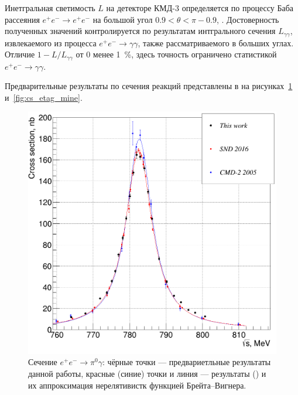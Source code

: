 Инетгральная светимость $L$ на детекторе КМД-3 определяется по процессу Баба рассеяния
$e^+e^- \to e^+e^-$ на большой угол $0.9 < \theta < \pi - 0.9$,
\cite{Ryzhenenkov:2017xqu}.
Достоверность полученных значений контролируется по результатам интгрального сечения $L_{\gamma \gamma}$,
извлекаемого из процесса $e^+e^- \to \gamma \gamma$,
также рассматриваемого в больших углах.
Отличие $1 - L / L_{\gamma \gamma}$ от 0 менее \SI{1}{\percent},
здесь точность ограничено статистикой $e^+e^- \to \gamma \gamma$.

Предварительные результаты по сечения реакций представлены в на рисунках~\ref{fig:cs_pi0g_mine} и~\ref{fig:cs_etag_mine}.

\begin{figure}[htbp]
	\begin{minipage}[t]{.48\textwidth}
		\centering
		\includegraphics[width=\textwidth]{img/my_pi0g_cross_section_for_pseudodisser.png}
		\caption{Сечение $e^+ e^- \to \pi^0 \gamma$:
			чёрные точки --- предвариетльные результаты данной работы,
			красные (синие) точки и линия --- результаты \cite{Achasov:2016bfr} (\cite{Akhmetshin:2004gw})
			и их аппроксимация нерелятивистк функцией Брейта--Вигнера.}\label{fig:cs_pi0g_mine}
	\end{minipage}
	\hfill
	\begin{minipage}[t]{.48\textwidth}
		\centering

\end{minipage}
\end{figure}
